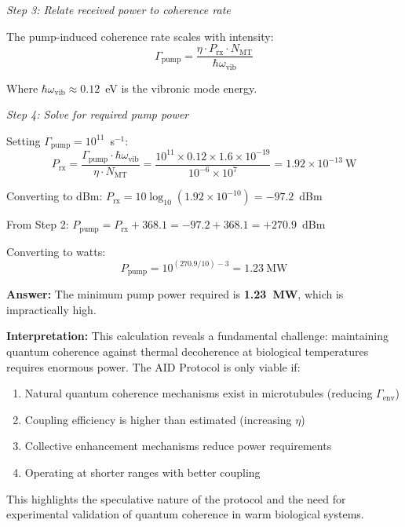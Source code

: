 \textit{Step 3: Relate received power to coherence rate}

The pump-induced coherence rate scales with intensity:
\begin{equation}
\Gamma_{\text{pump}} = \frac{\eta \cdot P_{\text{rx}} \cdot N_{\text{MT}}}{\hbar \omega_{\text{vib}}}
\end{equation}

Where $\hbar \omega_{\text{vib}} \approx 0.12$~eV is the vibronic mode energy.

\textit{Step 4: Solve for required pump power}

Setting $\Gamma_{\text{pump}} = 10^{11}$~s$^{-1}$:
\begin{equation}
P_{\text{rx}} = \frac{\Gamma_{\text{pump}} \cdot \hbar \omega_{\text{vib}}}{\eta \cdot N_{\text{MT}}} = \frac{10^{11} \times 0.12 \times 1.6 \times 10^{-19}}{10^{-6} \times 10^7} = 1.92 \times 10^{-13}~\text{W}
\end{equation}

Converting to dBm: $P_{\text{rx}} = 10\log_{10}(1.92 \times 10^{-10}) = -97.2$~dBm

From Step 2: $P_{\text{pump}} = P_{\text{rx}} + 368.1 = -97.2 + 368.1 = +270.9$~dBm

Converting to watts:
\begin{equation}
P_{\text{pump}} = 10^{(270.9/10) - 3} = 1.23~\text{MW}
\end{equation}

\textbf{Answer:} The minimum pump power required is \textbf{1.23~MW}, which is impractically high.

\textbf{Interpretation:} This calculation reveals a fundamental challenge: maintaining quantum coherence against thermal decoherence at biological temperatures requires enormous power. The AID Protocol is only viable if:
\begin{enumerate}
\item Natural quantum coherence mechanisms exist in microtubules (reducing $\Gamma_{\text{env}}$)
\item Coupling efficiency is higher than estimated (increasing $\eta$)
\item Collective enhancement mechanisms reduce power requirements
\item Operating at shorter ranges with better coupling
\end{enumerate}

This highlights the speculative nature of the protocol and the need for experimental validation of quantum coherence in warm biological systems.

